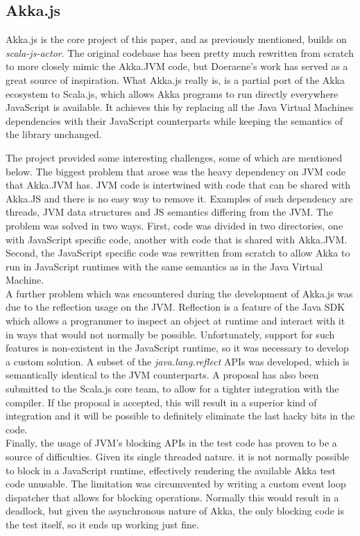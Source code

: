 \documentclass{sig-alternate}
\begin{document}
\subsection{Akka.js}

Akka.js is the core project of this paper, and as previously mentioned, builds on \textit{scala-js-actor}. The original codebase has been pretty much rewritten from scratch to more closely mimic the Akka.JVM code, but Doeraene's work has served as a great source of inspiration.
What Akka.js really is, is a partial port of the Akka ecosystem to Scala.js, which allows Akka programs to run directly everywhere JavaScript is available. It achieves this by replacing all the Java Virtual Machines dependencies with their JavaScript counterparts while keeping the semantics of the library unchanged.

The project provided some interesting challenges, some of which are mentioned below.
The biggest problem that arose was the heavy dependency on JVM code that Akka.JVM has. JVM code is intertwined with code that can be shared with Akka.JS and there is no easy way to remove it. Examples of such dependency are threads, JVM data structures and JS semantics differing from the JVM.
The problem was solved in two ways. First, code was divided in two directories, one with JavaScript specific code, another with code that is shared with Akka.JVM. Second, the JavaScript specific code was rewritten from scratch to allow Akka to run in JavaScript runtimes with the same semantics as in the Java Virtual Machine.
\\
A further problem which was encountered during the development of Akka.js was due to the reflection usage on the JVM. Reflection is a feature of the Java SDK which allows a programmer to inspect an object at runtime and interact with it in ways that would not normally be possible. Unfortunately, support for such features is non-existent in the JavaScript runtime, so it was necessary to develop a custom solution. A subset of the \emph{java.lang.reflect} APIs was developed, which is semantically identical to the JVM counterparts. A proposal has also been submitted to the Scala.js core team, to allow for a tighter integration with the compiler. 
If the proposal is accepted, this will result in a superior kind of integration and it will be possible to definitely eliminate the last hacky bits in the code.
\\
Finally, the usage of JVM's blocking APIs in the test code has proven to be a source of difficulties. Given its single threaded nature. it is not normally possible to block in a JavaScript runtime, effectively rendering the available Akka test code unusable. The limitation was circumvented by writing a custom event loop dispatcher that allows for blocking operations. Normally this would result
in a deadlock, but given the asynchronous nature of Akka, the only blocking code is the test itself, so it ends up working just fine.
\end{document}
